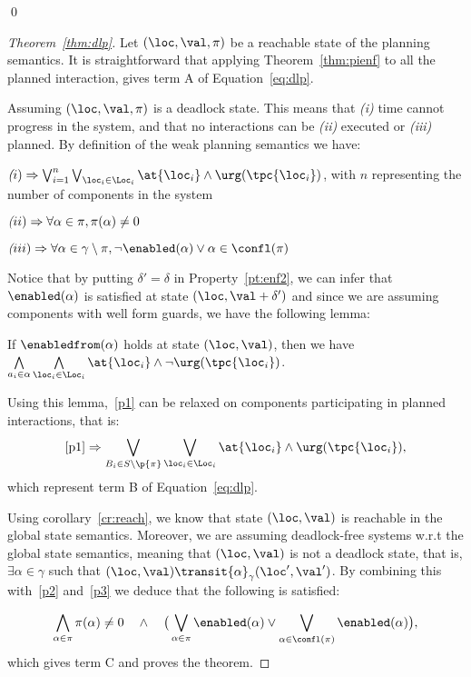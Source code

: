 \qed
\begin{proof}[Theorem~\ref{thm:dlp}]
  Let $(\loc,\val,\pi)$ be a reachable state of the planning semantics. It is straightforward that applying Theorem~\ref{thm:pienf} to all the planned interaction,
  gives term A of Equation~\ref{eq:dlp}.

  Assuming $(\loc,\val,\pi)$ is a deadlock state. This means that \emph{(i)} time cannot progress in the system, and that
  no interactions can be \emph{(ii)} executed or \emph{(iii)} planned.
  By definition of the weak planning semantics we have:\\
  \begin{description}[labelwidth=1.5cm]
    \item[\namedlabel{p1}{R1}] $\emph(i)\Rightarrow\bigvee_{i=1}^{n}\bigvee_{\loc_i\in\Loc_i}\at{\loc_i}\wedge\urg(\tpc{\loc_i})$, with $n$ representing the number of components in the system
    \item[\namedlabel{p2}{R2}] $\emph(ii)\Rightarrow\forall\alpha\in\pi,\pi(\alpha)\neq0$
    \item[\namedlabel{p3}{R3}] $\emph(iii)\Rightarrow\forall\alpha\in\gamma\setminus\pi,\neg\enabled(\alpha)\vee\alpha\in\confl(\pi)$
  \end{description}
Notice that by putting $\delta'=\delta$ in Property~\ref{pt:enf2}, we can infer that $\enabled(\alpha)$ is satisfied at state $(\loc,\val+\delta')$
and since we are assuming components with well form guards, we have the following lemma:
\begin{lemma}\label{p:inv}
   If $\enabledfrom(\alpha)$ holds at state $(\loc,\val)$, then
   we have $\bigwedge\limits_{a_i\in\alpha}\bigwedge\limits_{\loc_i\in\Loc_i}\at{\loc_i}\wedge\neg\urg(\tpc{\loc_i})$.
\end{lemma}
Using this lemma,~\ref{p1} can be relaxed on components participating in planned interactions, that is:
\begin{displaymath}
  \ref{p1}\Rightarrow\bigvee_{B_i\in S\setminus\p{\pi}}\bigvee_{\loc_i\in\Loc_i}\at{\loc_i}\wedge\urg(\tpc{\loc_i}),
\end{displaymath}
which represent term B of Equation~\ref{eq:dlp}.

Using corollary~\ref{cr:reach}, we know that state $(\loc,\val)$ is reachable in the global state semantics. Moreover,
we are assuming deadlock-free systems w.r.t the global state semantics, meaning that $(\loc,\val)$ is not a deadlock state,
that is, $\exists\alpha\in\gamma$ such that $(\loc,\val)\transit{\alpha}_{\gamma}(\loc',\val')$.
By combining this with~\ref{p2} and~\ref{p3} we deduce that the following is satisfied: 

\begin{displaymath}
  \bigwedge_{\alpha\in\pi}\pi(\alpha)\neq0\quad\wedge\quad\big(\bigvee_{\alpha\in\pi}\enabled(\alpha)\vee
  \bigvee_{\alpha\in\confl(\pi)}\enabled(\alpha)\big),
\end{displaymath}
which gives term C and proves the theorem.
\end{proof}
